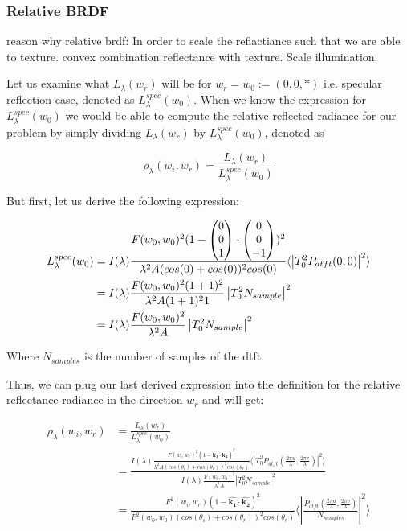 \subsubsection{Relative BRDF}
reason why relative brdf: In order to scale the reflactiance such that we are able to texture. 
convex combination reflectance with texture. Scale illumination.

Let us examine what $L_\lambda(w_r)$ will be for $w_r = w_0 := (0,0,*)$ i.e. specular reflection case, denoted as $L_\lambda^{spec}(w_0)$. 
When we know the expression for $L_\lambda^{spec}(w_0)$ we would be able to compute the relative reflected radiance for our problem by simply dividing $L_\lambda(w_r)$ by $L_\lambda^{spec}(w_0)$, denoted as 

\begin{equation}
    \rho_\lambda(w_i,w_r) = \frac{L_\lambda(w_r)}{L_\lambda^{spec}(w_0)}
\end{equation}

But first, let us derive the following expression:

\begin{align*}
L_\lambda^{spec}(w_0) 
& = I(\lambda) \frac{F(w_0, w_0)^2 (1-\colvec[0]{0}{1}\cdot\colvec[0]{0}{-1})^2}{\lambda^2 A (cos(0)+cos(0))^2 cos(0)} \langle \left|T_0^2 P_{dtft}(0,0)  \right|^2\rangle \\
& = I(\lambda) \frac{F(w_0, w_0)^2 (1+1)^2}{\lambda^2 A (1+1)^2 1}\left| T_0^2 N_{sample} \right|^2 \\
& = I(\lambda) \frac{F(w_0, w_0)^2}{\lambda^2 A}\left| T_0^2 N_{sample} \right|^2 
\end{align*}

Where $N_{samples}$ is the number of samples of the dtft.

Thus, we can plug our last derived expression into the definition for the relative reflectance radiance in the direction $w_r$ and will get:

\begin{align*}
\rho_\lambda(w_i,w_r)
& = \frac{L_\lambda(w_r)}{L_\lambda^{spec}(w_0)} \\
& = \frac{I(\lambda) \frac{F(w_i, w_r)^2 (1-\hat{\mathbf{k_1}}\cdot\hat{\mathbf{k_2}})^2}{\lambda^2 A (cos(\theta_i)+cos(\theta_r))^2 cos(\theta_r)} \langle \left|T_0^2 P_{dtft}(\frac{2\pi u}{\lambda}, \frac{2\pi v}{\lambda})  \right|^2\rangle}{I(\lambda) \frac{F(w_0, w_0)^2}{\lambda^2 A}\left| T_0^2 N_{sample} \right|^2 } \\
& = \frac{F^2(w_i,w_r)(1-\hat{\mathbf{k_1}}\cdot\hat{\mathbf{k_2}})^2}{F^2(w_0,w_0)(cos(\theta_i)+cos(\theta_r))^2 cos(\theta_r)}  \langle \left|\frac{P_{dtft}(\frac{2\pi u}{\lambda}, \frac{2\pi v}{\lambda})}{N_{samples}}\right|^2\rangle
\end{align*}

